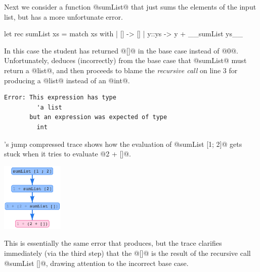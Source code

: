 Next we consider a function @sumList@ that just sums the elements of the
input list, but has a more unfortunate error.
\begin{ecode}
let rec sumList xs = match xs with
  | []    -> []
  | y::ys -> y + __sumList ys__
\end{ecode}
%
In this case the student has returned @[]@ in the base case instead of
@0@. Unfortunately, \ocaml deduces (incorrectly) from the base case that
@sumList@ must return a @list@, and then proceeds to blame the
\emph{recursive call} on line 3 for producing a @list@ instead of an
@int@.
%
\begin{verbatim}
Error: This expression has type
         'a list
       but an expression was expected of type
         int
\end{verbatim}
%
\toolname's jump compressed trace shows how the evaluation of
@sumList [1; 2]@ gets stuck when it tries to evaluate @2 + []@.
%
\begin{center}
  \includegraphics[height=125px]{sumlist.png}
\end{center}
%
This is essentially the same error that \ocaml produces, but the trace
clarifies immediately (via the third step) that the @[]@ is the result
of the recursive call @sumList []@, drawing attention to the incorrect
base case.


